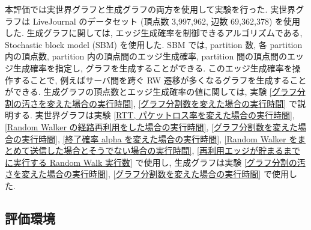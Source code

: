 本評価では実世界グラフと生成グラフの両方を使用して実験を行った. 実世界グラフは LiveJournal のデータセット\cite{snapnets} (頂点数 3,997,962, 辺数 69,362,378) を使用した. 生成グラフに関しては, エッジ生成確率を制御できるアルゴリズムである, Stochastic block model (SBM) \cite{SBM} を使用した. SBM では, partition 数, 各 partition 内の頂点数, partition 内の頂点間のエッジ生成確率, partition 間の頂点間のエッジ生成確率を指定し, グラフを生成することができる. このエッジ生成確率を操作することで, 例えばサーバ間を跨ぐ RW 遷移が多くなるグラフを生成することができる. 生成グラフの頂点数とエッジ生成確率の値に関しては, 実験 \ref{グラフ分割の汚さを変えた場合の実行時間}, \ref{グラフ分割数を変えた場合の実行時間} で説明する. 
実世界グラフは実験 \ref{RTT, パケットロス率を変えた場合の実行時間}, \ref{Random Walker の経路再利用をした場合の実行時間}, \ref{グラフ分割数を変えた場合の実行時間}, \ref{終了確率 alpha を変えた場合の実行時間}, \ref{Random Walker をまとめて送信した場合とそうでない場合の実行時間}, \ref{再利用エッジが貯まるまでに実行する Random Walk 実行数} で使用し, 生成グラフは実験 \ref{グラフ分割の汚さを変えた場合の実行時間}, \ref{グラフ分割数を変えた場合の実行時間} で使用した. 

\subsection{評価環境}


